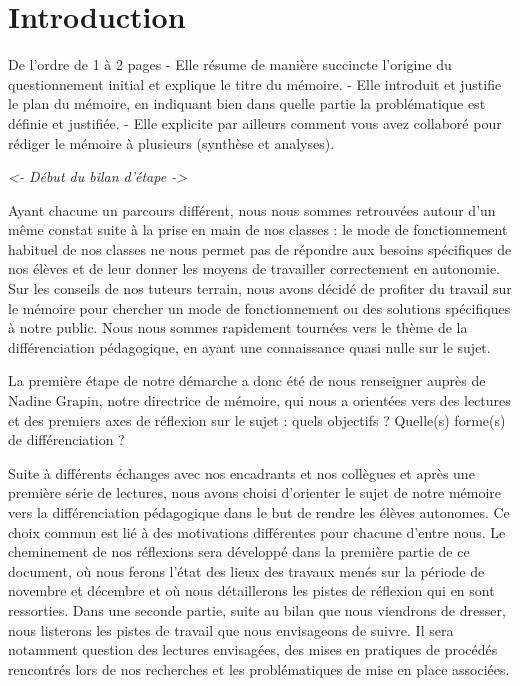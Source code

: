 \section{Introduction}


De l'ordre de 1 à 2 pages 
-	Elle résume de manière succincte l'origine du questionnement initial et explique le titre du mémoire.
-	 Elle introduit et justifie le plan du mémoire, en indiquant bien dans quelle partie la problématique est définie et justifiée. 
-	Elle explicite par ailleurs comment vous avez collaboré pour rédiger le mémoire à plusieurs (synthèse et analyses).


\textit{<- Début du bilan d'étape ->}

Ayant chacune un parcours différent, nous nous sommes retrouvées autour d’un même constat suite à la prise en main de nos classes : le mode de fonctionnement habituel de nos classes ne nous permet pas de répondre aux besoins spécifiques de nos élèves et de leur donner les moyens de travailler correctement en autonomie. Sur les conseils de nos tuteurs terrain, nous avons décidé de profiter du travail sur le mémoire pour chercher un mode de fonctionnement ou des solutions spécifiques à notre public. Nous nous sommes rapidement tournées vers le thème de la différenciation pédagogique, en ayant une connaissance quasi nulle sur le sujet.

La première étape de notre démarche a donc été de nous renseigner auprès de Nadine Grapin, notre directrice de mémoire, qui nous a orientées vers des lectures et des premiers axes de réflexion sur le sujet : quels objectifs ? Quelle(s) forme(s) de différenciation ? 

Suite à différents échanges avec nos encadrants et nos collègues et après une première série de lectures, nous avons choisi d’orienter le sujet de notre mémoire vers la différenciation pédagogique dans le but de rendre les élèves autonomes. Ce choix commun est lié à des motivations différentes pour chacune d’entre nous. 
Le cheminement de nos réflexions sera développé dans la première partie de ce document, où nous ferons l’état des lieux des travaux menés sur la période de novembre et décembre et où nous détaillerons les pistes de réflexion qui en sont ressorties.
Dans une seconde partie, suite au bilan que nous viendrons de dresser, nous listerons les pistes de travail que nous envisageons de suivre. Il sera notamment question des lectures envisagées, des mises en pratiques de procédés rencontrés lors de nos recherches et les problématiques de mise en place associées.

